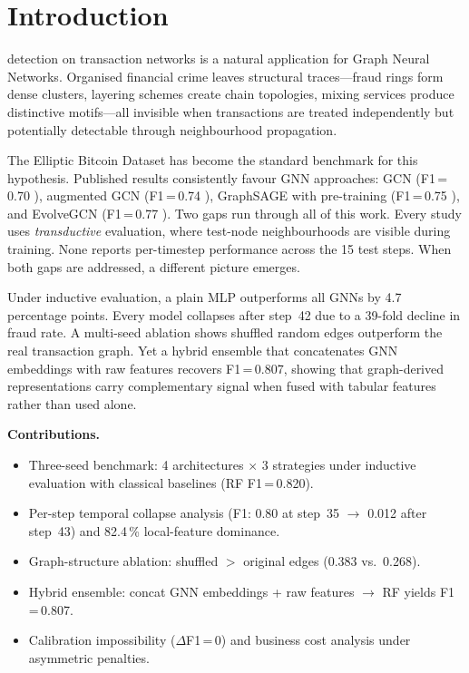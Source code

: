 \documentclass[journal,10pt,twoside]{IEEEtran}
\begin{document}
\section{Introduction}
\label{sec:intro}

 detection on transaction networks is a natural
application for Graph Neural Networks. Organised financial crime
leaves structural traces---fraud rings form dense clusters, layering
schemes create chain topologies, mixing services produce distinctive
motifs---all invisible when transactions are treated independently but
potentially detectable through neighbourhood propagation.

The Elliptic Bitcoin Dataset \cite{weber2019} has become the standard
benchmark for this hypothesis. Published results consistently favour
GNN approaches: GCN (F1\,=\,0.70 \cite{weber2019}), augmented GCN
(F1\,=\,0.74 \cite{alarab2020}), GraphSAGE with pre-training
(F1\,=\,0.75 \cite{lo2023}), and EvolveGCN (F1\,=\,0.77
\cite{pareja2020evolvegcn}). Two gaps run through all of this work.
Every study uses \emph{transductive} evaluation, where test-node
neighbourhoods are visible during training. None reports per-timestep
performance across the 15 test steps. When both gaps are addressed,
a different picture emerges.

Under inductive evaluation, a plain MLP outperforms all GNNs by 4.7
percentage points. Every model collapses after step~42 due to a
39-fold decline in fraud rate. A multi-seed ablation shows shuffled
random edges outperform the real transaction graph. Yet a hybrid
ensemble that concatenates GNN embeddings with raw features recovers
F1\,=\,0.807, showing that graph-derived representations carry
complementary signal when fused with tabular features rather than used
alone.

\smallskip\noindent\textbf{Contributions.}
\begin{itemize}[leftmargin=*,nosep]
\item Three-seed benchmark: 4 architectures $\times$ 3 strategies
  under inductive evaluation with classical baselines (RF F1\,=\,0.820).
\item Per-step temporal collapse analysis (F1: 0.80 at step~35
  $\to$ 0.012 after step~43) and 82.4\,\% local-feature dominance.
\item Graph-structure ablation: shuffled $>$ original edges
  (0.383 vs.\ 0.268).
\item Hybrid ensemble: concat GNN embeddings + raw features
  $\to$ RF yields F1\,=\,0.807.
\item Calibration impossibility ($\Delta$F1\,=\,0) and business
  cost analysis under asymmetric penalties.
\end{itemize}
\end{document}
